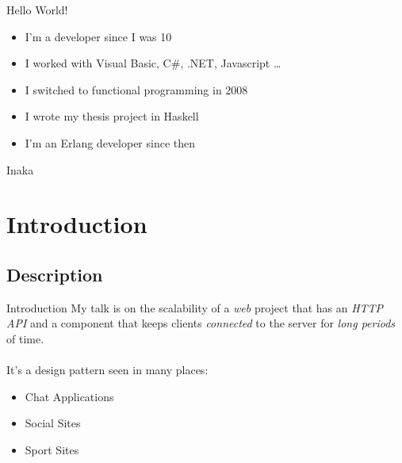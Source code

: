 \documentclass[utf8]{beamer}
\begin{document}



\frame{\titlepage} 

\begin{frame}{Hello World!}
	\begin{itemize}
		\item<+-> I'm a developer since I was 10
		\item<+-> I worked with Visual Basic, C\#, .NET, Javascript \ldots
		\item<+-> I switched to functional programming in 2008
		\item<+-> I wrote my thesis project in Haskell
		\item<+-> I'm an Erlang developer since then
	\end{itemize}
\end{frame}
\begin{frame}{Inaka}
	
\end{frame}

\section{Introduction}
\subsection{Description}
\begin{frame}{Introduction}
	My talk is on the scalability of a \emph{web} project \pause that has an \emph{HTTP API} \pause and a component that keeps clients \emph{connected} to the server for \emph{long periods} of time.\\ ~ \\ \pause
	It's a design pattern seen in many places:
	\begin{itemize}
		\item Chat Applications
		\item Social Sites
		\item Sport Sites
	\end{itemize}
\end{frame}
\end{document}
